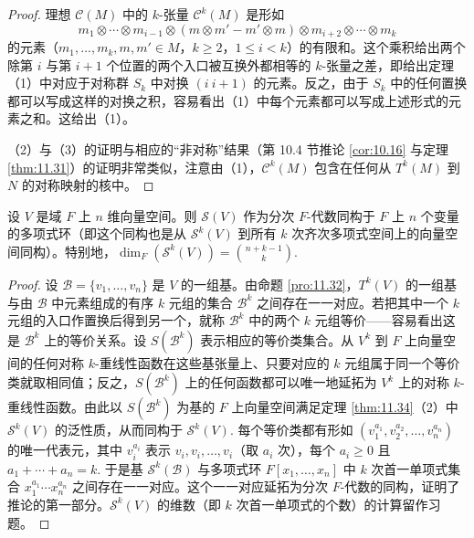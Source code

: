 \begin{proof}
理想 \(\mathcal{C}(M)\) 中的 \(k\)-张量 \(\mathcal{C}^k(M)\) 是形如
\[
m_1 \otimes \cdots \otimes m_{i-1} \otimes (m \otimes m' - m' \otimes m) \otimes m_{i+2} \otimes \cdots \otimes m_k
\]
的元素（\(m_1, \ldots, m_k, m, m' \in M\)，\(k \geq 2\)，\(1 \leq i < k\)）的有限和。这个乘积给出两个除第 \(i\) 与第 \(i+1\) 个位置的两个入口被互换外都相等的 \(k\)-张量之差，即给出定理（1）中对应于对称群 \(S_k\) 中对换 \((i\ i+1)\) 的元素。反之，由于 \(S_k\) 中的任何置换都可以写成这样的对换之积，容易看出（1）中每个元素都可以写成上述形式的元素之和。这给出（1）。

（2）与（3）的证明与相应的“非对称”结果（第 10.4 节推论 \ref{cor:10.16} 与定理 \ref{thm:11.31}）的证明非常类似，注意由（1），\(\mathcal{C}^k(M)\) 包含在任何从 \(T^k(M)\) 到 \(N\) 的对称映射的核中。
\end{proof}

\begin{corollary}\label{cor:11.35}
设 \(V\) 是域 \(F\) 上 \(n\) 维向量空间。则 \(\mathcal{S}(V)\) 作为分次 \(F\)-代数同构于 \(F\) 上 \(n\) 个变量的多项式环（即这个同构也是从 \(\mathcal{S}^k(V)\) 到所有 \(k\) 次齐次多项式空间上的向量空间同构）。特别地，\(\dim_F(\mathcal{S}^k(V)) = \binom{n+k-1}{k}\).
\end{corollary}

\begin{proof}
设 \(\mathcal{B} = \{v_1, \ldots, v_n\}\) 是 \(V\) 的一组基。由命题 \ref{pro:11.32}，\(T^k(V)\) 的一组基与由 \(\mathcal{B}\) 中元素组成的有序 \(k\) 元组的集合 \(\mathcal{B}^k\) 之间存在一一对应。若把其中一个 \(k\) 元组的入口作置换后得到另一个，就称 \(\mathcal{B}^k\) 中的两个 \(k\) 元组等价——容易看出这是 \(\mathcal{B}^k\) 上的等价关系。设 \(S(\mathcal{B}^k)\) 表示相应的等价类集合。从 \(V^k\) 到 \(F\) 上向量空间的任何对称 \(k\)-重线性函数在这些基张量上、只要对应的 \(k\) 元组属于同一个等价类就取相同值；反之，\(S(\mathcal{B}^k)\) 上的任何函数都可以唯一地延拓为 \(V^k\) 上的对称 \(k\)-重线性函数。由此以 \(S(\mathcal{B}^k)\) 为基的 \(F\) 上向量空间满足定理 \ref{thm:11.34}（2）中 \(\mathcal{S}^k(V)\) 的泛性质，从而同构于 \(\mathcal{S}^k(V)\). 每个等价类都有形如 \((v_1^{a_1}, v_2^{a_2}, \ldots, v_n^{a_n})\) 的唯一代表元，其中 \(v_i^{a_i}\) 表示 \(v_i, v_i, \ldots, v_i\)（取 \(a_i\) 次），每个 \(a_i \geq 0\) 且 \(a_1+\cdots+a_n = k\). 于是基 \(\mathcal{S}^k(\mathcal{B})\) 与多项式环 \(F[x_1, \ldots, x_n]\) 中 \(k\) 次首一单项式集合 \(x_1^{a_1}\cdots x_n^{a_n}\) 之间存在一一对应。这个一一对应延拓为分次 \(F\)-代数的同构，证明了推论的第一部分。\(\mathcal{S}^k(V)\) 的维数（即 \(k\) 次首一单项式的个数）的计算留作习题。
\end{proof}

